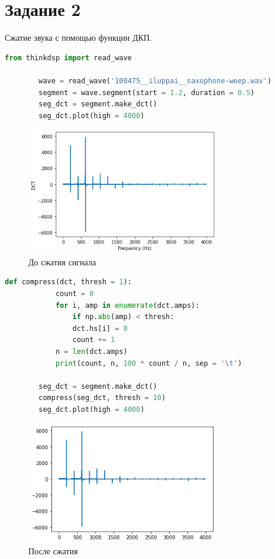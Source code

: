 \documentclass[a4paper, 12pt]{report}
\begin{document}
	\section{Задание 2}
	Сжатие звука с помощью функции ДКП.
	\begin{lstlisting}[language=Python,caption=Получение исходного сигнала]
		from thinkdsp import read_wave

		wave = read_wave('100475__iluppai__saxophone-weep.wav')
		segment = wave.segment(start = 1.2, duration = 0.5)
		seg_dct = segment.make_dct()
		seg_dct.plot(high = 4000)
	\end{lstlisting}
	\begin{figure}[H]
		\centering
		\includegraphics[width=0.75\textwidth]{dct4.png}
		\caption{До сжатия сигнала}
		\label{fig:dct4}
	\end{figure}
	\begin{lstlisting}[language=Python,caption=Функция для сжатия сигнала]
		def compress(dct, thresh = 1):
			count = 0
			for i, amp in enumerate(dct.amps):
				if np.abs(amp) < thresh:
				dct.hs[i] = 0
				count += 1       
			n = len(dct.amps)
			print(count, n, 100 * count / n, sep = '\t')

		seg_dct = segment.make_dct()
		compress(seg_dct, thresh = 10)
		seg_dct.plot(high = 4000)
	\end{lstlisting}
	\begin{figure}[H]
		\centering
		\includegraphics[width=0.75\textwidth]{dct5.png}
		\caption{После сжатия}
		\label{fig:dct5}
	\end{figure}
\end{document}
